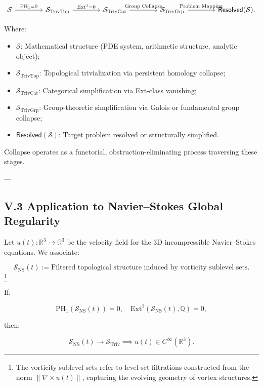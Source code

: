 \documentclass[11pt]{article}
\begin{document}
\[
\begin{tikzcd}[column sep=4em]
\mathcal{S} \arrow[r, "\mathrm{PH}_1 = 0"]
& \mathcal{S}_{\mathrm{TrivTop}} \arrow[r, "\mathrm{Ext}^1 = 0"]
& \mathcal{S}_{\mathrm{TrivCat}} \arrow[r, "\text{Group Collapse}"]
& \mathcal{S}_{\mathrm{TrivGrp}} \arrow[r, "\text{Problem Mapping}"]
& \mathsf{Resolved}(\mathcal{S}).
\end{tikzcd}
\]

Where:
\begin{itemize}
    \item $\mathcal{S}$: Mathematical structure (PDE system, arithmetic structure, analytic object);
    \item $\mathcal{S}_{\mathrm{TrivTop}}$: Topological trivialization via persistent homology collapse;
    \item $\mathcal{S}_{\mathrm{TrivCat}}$: Categorical simplification via Ext-class vanishing;
    \item $\mathcal{S}_{\mathrm{TrivGrp}}$: Group-theoretic simplification via Galois or fundamental group collapse;
    \item $\mathsf{Resolved}(\mathcal{S})$: Target problem resolved or structurally simplified.
\end{itemize}

Collapse operates as a functorial, obstruction-eliminating process traversing these stages.

---

\subsection*{V.3 Application to Navier–Stokes Global Regularity}

Let $u(t) : \mathbb{R}^3 \to \mathbb{R}^3$ be the velocity field for the 3D incompressible Navier–Stokes equations.  
We associate:

\[
\mathcal{S}_{\mathrm{NS}}(t) := \text{Filtered topological structure induced by vorticity sublevel sets}.
\]
\footnote{The vorticity sublevel sets refer to level-set filtrations constructed from the norm $\|\nabla \times u(t)\|$, capturing the evolving geometry of vortex structures.}


If:

\[
\mathrm{PH}_1(\mathcal{S}_{\mathrm{NS}}(t)) = 0, \quad \mathrm{Ext}^1(\mathcal{S}_{\mathrm{NS}}(t), \mathbb{Q}) = 0,
\]

then:

\[
\mathcal{S}_{\mathrm{NS}}(t) \longrightarrow \mathcal{S}_{\mathrm{Triv}} \implies u(t) \in C^\infty(\mathbb{R}^3).
\]
\end{document}
